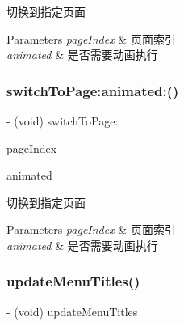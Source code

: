 切换到指定页面


\begin{DoxyParams}{Parameters}
{\em page\+Index} & 页面索引 \\
\hline
{\em animated} & 是否需要动画执行 \\
\hline
\end{DoxyParams}
\mbox{\label{interface_v_t_magic_view_a419f8745d0c6afd26f97b782a643426e}} 
\subsubsection{\texorpdfstring{switch\+To\+Page\+:animated\+:()}{switchToPage:animated:()}\hspace{0.1cm}{\footnotesize\ttfamily [3/3]}}
{\footnotesize\ttfamily -\/ (void) switch\+To\+Page\+: \begin{DoxyParamCaption}\item[{(N\+S\+U\+Integer)}]{page\+Index }\item[{animated:(B\+O\+OL)}]{animated }\end{DoxyParamCaption}}

切换到指定页面


\begin{DoxyParams}{Parameters}
{\em page\+Index} & 页面索引 \\
\hline
{\em animated} & 是否需要动画执行 \\
\hline
\end{DoxyParams}
\mbox{\label{interface_v_t_magic_view_a87cfe336988bf4d06aa52c3e1bbef132}} 
\subsubsection{\texorpdfstring{update\+Menu\+Titles()}{updateMenuTitles()}\hspace{0.1cm}{\footnotesize\ttfamily [1/3]}}
{\footnotesize\ttfamily -\/ (void) update\+Menu\+Titles \begin{DoxyParamCaption}{ }\end{DoxyParamCaption}}

